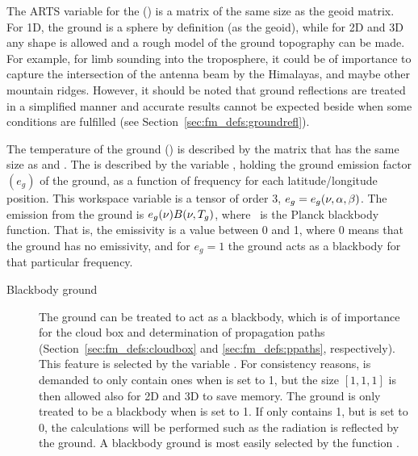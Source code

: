 The ARTS variable for the 
() is a matrix of the same size as the geoid
matrix. For 1D, the ground is a sphere by definition (as the geoid),
while for 2D and 3D any shape is allowed and a rough model of the
ground topography can be made. For example, for limb sounding into the
troposphere, it could be of importance to capture the intersection of
the antenna beam by the Himalayas, and maybe other mountain ridges.
However, it should be noted that ground reflections are treated in a
simplified manner and accurate results cannot be expected beside when
some conditions are fulfilled (see
Section~\ref{sec:fm_defs:groundrefl}).

The temperature of the ground () is
described by the matrix  that has the same size as
 and . The  is described by the variable , holding
the ground emission factor $(e_g)$ of the ground, as a function of
frequency for each latitude/longitude position. This workspace
variable is a tensor of order 3, $e_g = e_g(\nu,\alpha,\beta)$. The
emission from the ground is $e_g(\nu)B(\nu,T_{g})$, where
\Planck\ is the Planck blackbody function. That is, the emissivity is
a value between 0 and 1, where 0 means that the ground has no
emissivity, and for $e_g=1$ the ground acts as a blackbody for that
particular frequency.

\begin{description}
\item[Blackbody ground] The ground can be
  treated to act as a blackbody, which is of importance for the cloud
  box and determination of propagation paths
  (Section~\ref{sec:fm_defs:cloudbox} and \ref{sec:fm_defs:ppaths},
  respectively). This feature is selected by the variable
  . For consistency reasons,
   is demanded to only contain ones when
   is set to 1, but the size $[1,1,1]$ is
  then allowed also for 2D and 3D to save memory. The ground is only
  treated to be a blackbody when  is set
  to 1. If  only contains 1, but
   is set to 0, the calculations will be
  performed such as the radiation is reflected by the ground. A
  blackbody ground is most easily selected by the function
  .
\end{description}


